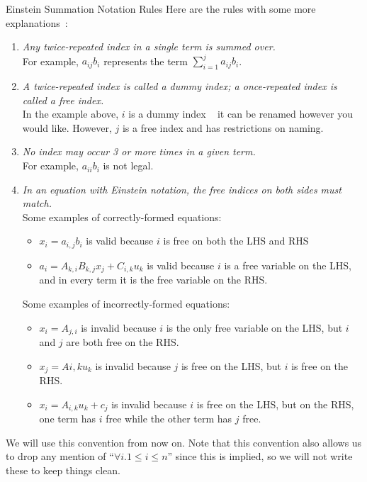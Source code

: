 \documentclass[aspectratio=169,xcolor=dvipsnames]{beamer}
\begin{document}
\begin{frame}{Einstein Summation Notation Rules}
      Here are the rules with some more explanations~\cite{Khan2023}:
      \begin{enumerate}
      \item<only@1> \textit{Any twice-repeated index in a single term is summed over.}\\
            For example, $a_{ij}b_i$ represents the term $\sum_{i=1}^j a_{ij}b_i$.
      \item<only@1> \textit{A twice-repeated index is called a dummy index; a once-repeated 
            index is called a free index.}\\
            In the example above, $i$ is a dummy index \textemdash~ it can be renamed
            however you would like. However, $j$ is a free index and has restrictions on naming.
      \item<only@1> \textit{No index may occur 3 or more times in a given term.}\\
            For example, $a_{ii}b_i$ is not legal.
      \item<only@2>{\textit{In an equation with Einstein notation, the free indices on both sides must
            match.}\\

            \noindent Some examples of correctly-formed equations:

            \begin{itemize}
            \item $x_i = a_{i,j}b_i$ is valid because $i$ is free on both the LHS and RHS
            \item $a_i = A_{k,i}B_{k,j}x_j + C_{i,k}u_k$ is valid because $i$ is a free variable on
                  the LHS, and in every term it is the free variable on the RHS.
            \end{itemize}

            \noindent Some examples of incorrectly-formed equations:

            \begin{itemize}
            \item $x_i = A_{j,i}$ is invalid because $i$ is the only free variable on the LHS, but
                  $i$ and $j$ are both free on the RHS.
            \item $x_j = A{i,k}u_k$ is invalid because $j$ is free on the LHS, but $i$ is free on 
                  the RHS.
            \item $x_i = A_{i,k}u_k + c_j$ is invalid because $i$ is free on the LHS, but on the 
                  RHS, one term has $i$ free while the other term has $j$ free.
            \end{itemize}}

      \end{enumerate}
      We will use this convention from now on. Note that this convention also allows us
      to drop any mention of ``$\forall i . 1 \leq i \leq n$'' since this is implied, so
      we will not write these to keep things clean.
  \end{frame}
\end{document}
